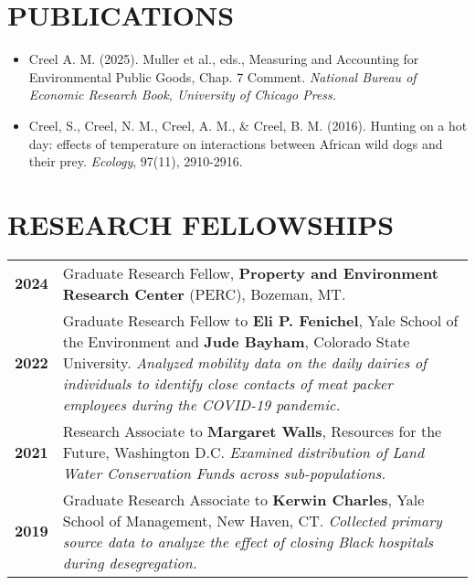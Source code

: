 \documentclass[11pt]{article}
\begin{document}
\section*{PUBLICATIONS}

\begin{itemize}[left=0pt, label={}, align=left, itemsep=0pt, parsep=0pt]
    \setlength{\itemindent}{-1em}
    \setlength{\leftskip}{1em}
    \setlength{\parindent}{-1em}
    \item Creel A. M. (2025). Muller et al., eds., Measuring and Accounting for Environmental Public Goods, Chap. 7 Comment. \textit{National Bureau of Economic Research Book, University of Chicago Press.}
    \item Creel, S., Creel, N. M., Creel, A. M., \& Creel, B. M. (2016). Hunting on a hot day: effects of temperature on interactions between African wild dogs and their prey. \textit{Ecology}, 97(11), 2910-2916.
\end{itemize}
\newpage


\section*{RESEARCH FELLOWSHIPS}
\begin{longtable}{>{\bfseries}r p{5.5in}} %
2024 & Graduate Research Fellow, \textbf{Property and Environment Research Center} (PERC), Bozeman, MT. \\
2022 & Graduate Research Fellow to \textbf{Eli P. Fenichel}, Yale School of the Environment and \textbf{Jude Bayham}, Colorado State University. \textit{Analyzed mobility data on the daily dairies of individuals to identify close contacts of meat packer employees during the COVID-19 pandemic.} \\
2021 & Research Associate to \textbf{Margaret Walls}, Resources for the Future, Washington D.C. \textit{Examined distribution of Land Water Conservation Funds across sub-populations.}\\
2019 & Graduate Research Associate to \textbf{Kerwin Charles}, Yale School of Management, New Haven, CT. \textit{Collected primary source data to analyze the effect of closing Black hospitals during desegregation.} \\
\end{longtable}
\end{document}
